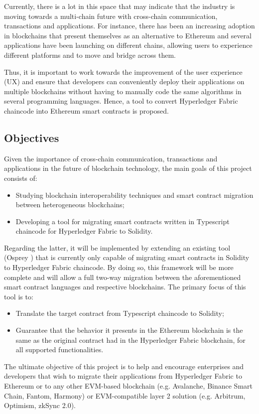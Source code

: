 \documentclass[runningheads]{llncs}
\begin{document}
Currently, there is a lot in this space that may indicate that the industry is moving towards a multi-chain future with cross-chain communication, transactions and applications. For instance, there has been an increasing adoption in blockchains that present themselves as an alternative to Ethereum and several applications have been launching on different chains, allowing users to experience different platforms and to move and bridge across them.

Thus, it is important to work towards the improvement of the user experience (UX) and ensure that developers can conveniently deploy their applications on multiple blockchains without having to manually code the same algorithms in several programming languages. Hence, a tool to convert Hyperledger Fabric \cite{fabric} chaincode into Ethereum smart contracts is proposed.

\subsection{Objectives}
Given the importance of cross-chain communication, transactions and applications in the future of blockchain technology, the main goals of this project consists of:
\begin{itemize}
    \item Studying blockchain interoperability techniques and smart contract migration between heterogeneous blockchains;
    \item Developing a tool for migrating smart contracts written in Typescript chaincode for Hyperledger Fabric to Solidity.
\end{itemize}
Regarding the latter, it will be implemented by extending an existing tool (Osprey \cite{abrunhosa_2021}) that is currently only capable of migrating smart contracts in Solidity to Hyperledger Fabric chaincode. By doing so, this framework will be more complete and will allow a full two-way migration between the aforementioned smart contract languages and respective blockchains. The primary focus of this tool is to:
\begin{itemize}
    \item Translate the target contract from Typescript chaincode to Solidity;
    \item Guarantee that the behavior it presents in the Ethereum blockchain is the same as the original contract had in the Hyperledger Fabric blockchain, for all supported functionalities.
\end{itemize}
The ultimate objective of this project is to help and encourage enterprises and developers that wish to migrate their applications from Hyperledger Fabric to Ethereum or to any other EVM-based blockchain (e.g. Avalanche, Binance Smart Chain, Fantom, Harmony) or EVM-compatible layer 2 solution (e.g. Arbitrum, Optimism, zkSync 2.0).
\end{document}
